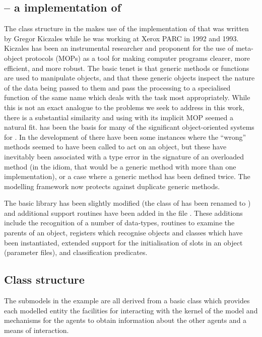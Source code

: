\subsection{\SCLOS -- a \Scheme implementation of \CLOS}

The class structure in the \ReModel makes use of the \Scheme
implementation of \SCLOS that was written by Gregor
Kiczales \cite{kiczales1993xerox} while he was working at Xerox PARC
in 1992 and 1993.  Kiczales has been an instrumental researcher and
proponent for the use of meta-object protocols (MOPs) as a tool for
making computer programs clearer, more efficient, and more robust.
The basic tenet is that generic methods or functions are used to
manipulate objects, and that these generic objects inspect the nature
of the data being passed to them and pass the processing to a
specialised function of the same name which deals with the task most
appropriately.  While this is not an exact analogue to the problems we
seek to address in this work, there is a substantial similarity and
using \SCLOS with its implicit MOP seemed a natural fit.  \SCLOS has
been the basis for many of the significant object-oriented systems for
\Scheme.  In the development of \ReModel there have been some
instances where the ``wrong'' methods seemed to have been
called to act on an object, but these have inevitably been associated
with a type error in the signature of an overloaded method (in
the \SCLOS idiom, that would be a generic method with more than one
implementation), or a case where a generic method has been defined
twice. The modelling framework now protects against duplicate generic
methods. 

The basic \SCLOS library has been slightly modified
(the  class of \SCLOS has been renamed
to ) and additional support routines have
been added in the file .  These additions
include the recognition of a number of \Scheme data-types, routines to
examine the parents of an object, registers which recognise objects
and classes which have been instantiated, extended support for the
initialisation of slots in an \SCLOS object (parameter files), and
classification predicates.  

\subsection{Class structure}
The submodels in the example are all derived from a basic
 class which provides each modelled entity the
facilities for interacting with the kernel of the model and mechanisms
for the agents to obtain information about the other agents and a
means of interaction.

